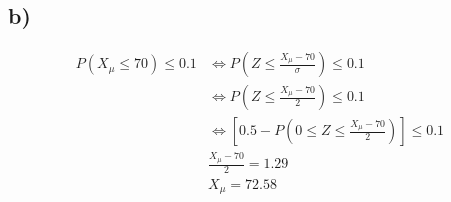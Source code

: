 \documentclass{article}
\begin{document}
	\subsection*{b)}
		\begin{align*}
			P(X_\mu \leq 70) \leq 0.1 &\iff P(Z \leq \frac{X_\mu - 70}{\sigma}) \leq 0.1\\
			&\iff P(Z \leq \frac{X_\mu -70}{2}) \leq 0.1 \\
			&\iff [0.5 - P(0\leq Z \leq \frac{X_\mu -70}{2})] \leq 0.1 \\
			& \frac{X_\mu - 70}{2} = 1.29 \\
			& X_\mu = 72.58
		\end{align*}
\end{document}
